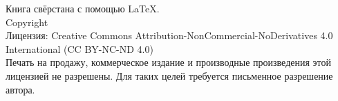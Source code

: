 \documentclass[oneside,openany]{book}
\makeatletter
\newcommand{\booklicense}{Creative Commons Attribution-NonCommercial-NoDerivatives 4.0 International (CC BY-NC-ND 4.0)}
\newcommand{\bookauthor}{\@author}
\theoremstyle{definition}
\theoremstyle{plain}
\theoremstyle{remark}
\makeatother
\begin{document}
\begin{titlepage}
\begin{flushleft}
    \noindent\begin{minipage}[b]{.7\linewidth}
      {\fontsize{9pt}{12pt}\selectfont
       \textbf{}\par}
      \vspace{2pt}
      {\fontsize{8pt}{11pt}\selectfont
       \par}
      \vspace{6pt}
      {\fontsize{8pt}{11pt}\selectfont
       \par}
    \end{minipage}%
    \hfill
    \begin{minipage}[b]{.25\linewidth}\raggedleft
      {\fontsize{8.5pt}{11pt}\selectfont
       \par}
    \end{minipage}

  \end{flushleft}
  \restoregeometry
\end{titlepage}

\color{black}
\rmfamily

\thispagestyle{empty}
\begin{flushleft}
\vspace*{\fill}
Книга свёрстана с помощью \LaTeX{}.\\
\vspace{\fill}
Copyright \textcopyright{} \the\year{}  \bookauthor\\
Лицензия: \booklicense\\
\vspace{0.5em}
Печать на продажу, коммерческое издание и производные произведения этой лицензией не разрешены. Для таких целей требуется письменное разрешение автора.
\end{flushleft}

\addtocounter{page}{2}



\tableofcontents



\mainmatter

\end{document}
